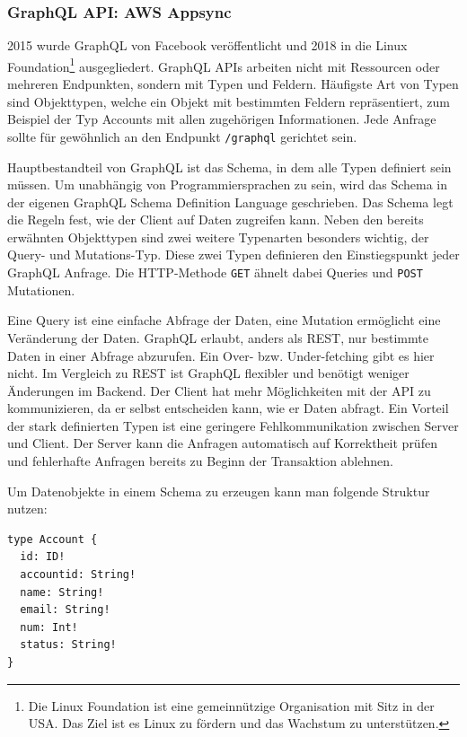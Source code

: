 \subsubsection{GraphQL API: AWS Appsync}
\label{GraphQL}
2015 wurde GraphQL von Facebook veröffentlicht und 2018 in die Linux Foundation\footnote{Die Linux Foundation ist eine gemeinnützige Organisation mit Sitz in der USA.
Das Ziel ist es Linux zu fördern und das Wachstum zu unterstützen.} ausgegliedert.
GraphQL APIs arbeiten nicht mit Ressourcen oder mehreren Endpunkten, sondern mit Typen und Feldern.
Häufigste Art von Typen sind Objekttypen, welche ein Objekt mit bestimmten Feldern repräsentiert, zum Beispiel der Typ Accounts mit allen zugehörigen Informationen.
Jede Anfrage sollte für gewöhnlich an den Endpunkt \verb+/graphql+ gerichtet sein.

Hauptbestandteil von GraphQL ist das Schema, in dem alle Typen definiert sein müssen.
Um unabhängig von Programmiersprachen zu sein, wird das Schema in der eigenen GraphQL Schema Definition Language geschrieben.
Das Schema legt die Regeln fest, wie der Client auf Daten zugreifen kann.
Neben den bereits erwähnten Objekttypen sind zwei weitere Typenarten besonders wichtig, der Query- und Mutations-Typ.
Diese zwei Typen definieren den Einstiegspunkt jeder GraphQL Anfrage.
Die HTTP-Methode \verb+GET+ ähnelt dabei Queries und \verb+POST+ Mutationen. \cite[]{GraphQL1}

Eine Query ist eine einfache Abfrage der Daten, eine Mutation ermöglicht eine Veränderung der Daten.
GraphQL erlaubt, anders als REST, nur bestimmte Daten in einer Abfrage abzurufen. Ein Over- bzw. Under-fetching gibt es hier nicht.
Im Vergleich zu REST ist GraphQL flexibler und benötigt weniger Änderungen im Backend.
Der Client hat mehr Möglichkeiten mit der API zu kommunizieren, da er selbst entscheiden kann, wie er Daten abfragt.
Ein Vorteil der stark definierten Typen ist eine geringere Fehlkommunikation zwischen Server und Client.
Der Server kann die Anfragen automatisch auf Korrektheit prüfen und fehlerhafte Anfragen bereits zu Beginn der Transaktion ablehnen.

Um Datenobjekte in einem Schema zu erzeugen kann man folgende Struktur nutzen:
\begin{lstlisting}[basicstyle=\ttfamily, breaklines=true , frame = single, backgroundcolor=\color{lightgray} ]
type Account {
  id: ID!
  accountid: String!
  name: String!
  email: String!
  num: Int!
  status: String!
}
\end{lstlisting}

